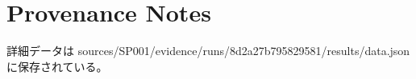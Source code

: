 \section{Provenance Notes}
詳細データは sources/SP001/evidence/runs/8d2a27b795829581/results/data.json に保存されている。
